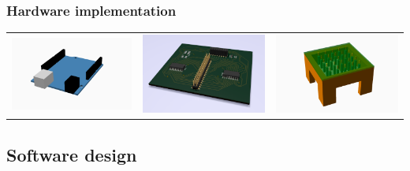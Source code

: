 \documentclass{beamer}
\begin{document}
\begin{frame}
    \frametitle{Hardware implementation}
    \begin{center}
        \begin{tabular}{ccc}
            \includegraphics[width=.33\textwidth]{img/arduino.png}&
            \includegraphics[width=.33\textwidth]{img/board.png}&
            \includegraphics[width=.33\textwidth]{img/foam_table.png}
        \end{tabular}
    \end{center}


\end{frame}

\subsection{Software design}%
\label{sub:soft_design}
\end{document}
